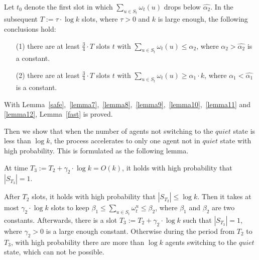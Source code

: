 \begin{lemma}
    \label{lemma12}
    Let $t_0$ denote the first slot in which ${\sum}_{u\in S_t}\omega_t(u)$
    drops below $\hat{\alpha_2}$. In the subsequent $T :=\tau\cdot\log k$ slots,
    where $\tau > 0$ and $k$ is large enough, the following conclusions hold:
    \begin{itemize}
        \item[(1)] there are at least $\frac{3}{4}\cdot T$ slots $t$
        with ${\sum}_{u\in S_t}\omega_t(u) \leq \alpha_2$, where $\alpha_2 > \hat{\alpha_2}$
        is a constant.
        \item[(2)] there are at least $\frac{3}{4}\cdot T$ slots $t$
        with ${\sum}_{u\in S_t}\omega_t(u) \geq \alpha_1\cdot k$, where $\alpha_1 < \hat{\alpha_1}$
        is a constant.
    \end{itemize}
\end{lemma}


With Lemma~\ref{safe},~\ref{lemma7},~\ref{lemma8},~\ref{lemma9},~\ref{lemma10},~\ref{lemma11} and
\ref{lemma12}, Lemma~\ref{fast} is proved.


Then we show that when the number of agents not switching to 
the $quiet$ state is less than $\log k$, the process accelerates to 
only one agent not in $quiet$ state with high probability.
This is formulated as the following lemma.

\begin{lemma}
    \label{slow}
    At time $T_3 :=T_2 +\gamma_2 \cdot \log k = O(k)$, it holds with high
    probability that $|S_{T_3}| = 1$.
\end{lemma}

\begin{IEEEproof}
    After $T_2$ slots, it holds with high probability 
    that $|S_{T_2}| \leq \log k$. Then it takes at most $\gamma_2 \cdot \log k$
    slots to keep $\beta_1 \leq \sum_{u\in S_t} \omega_t^u \leq \beta_2$,
    where $\beta_1$ and $\beta_2$ are two constants.
    Afterwards, there is a slot $T_3 :=T_2 +\gamma_2\cdot\log k$ such that
    $|S_{T_3}| = 1$, where $\gamma_2 > 0$ is a large enough constant. 
    Otherwise during the period from $T_2$ to $T_3$,
    with high probability there are 
    more than $\log k$ agents switching to
    the $quiet$ state, which can not be possible.
\end{IEEEproof}

